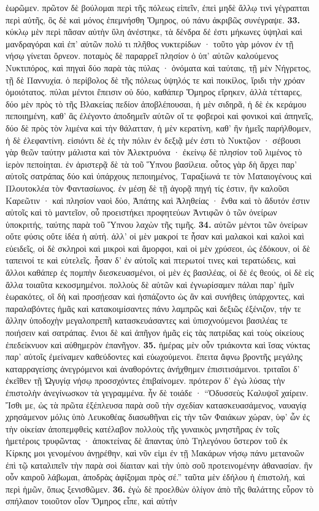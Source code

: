 \documentclass[a4paper, 11pt, oneside, polutonikogreek, german]{article}
\begin{document}
ἑωρῶμεν. πρῶτον δὲ βούλομαι περὶ τῆς πόλεως εἰπεῖν, ἐπεὶ μηδὲ ἄλλῳ τινὶ γέγραπται περὶ αὐτῆς, ὃς δὲ καὶ μόνος ἐπεμνήσθη Ὅμηρος, οὐ πάνυ ἀκριβῶς συνέγραψε. \textbf{33.} κύκλῳ μὲν περὶ πᾶσαν αὐτὴν ὕλη ἀνέστηκε, τὰ δένδρα δέ ἐστι μήκωνες ὑψηλαὶ καὶ μανδραγόραι καὶ ἐπ' αὐτῶν πολύ τι πλῆθος νυκτερίδων · τοῦτο γὰρ μόνον ἐν τῇ νήσῳ γίνεται ὄρνεον. ποταμὸς δὲ παραρρεῖ πλησίον ὁ ὑπ' αὐτῶν καλούμενος Νυκτιπόρος, καὶ πηγαὶ δύο παρὰ τὰς πύλας · ὀνόματα καὶ ταύταις, τῇ μὲν Νήγρετος, τῇ δὲ Παννυχία. ὁ περίβολος δὲ τῆς πόλεως ὑψηλός τε καὶ ποικίλος, ἴριδι τὴν χρόαν ὁμοιότατος. πύλαι μέντοι ἔπεισιν οὐ δύο, καθάπερ Ὅμηρος εἴρηκεν, ἀλλὰ τέτταρες, δύο μὲν πρὸς τὸ τῆς Βλακείας πεδίον ἀποβλέπουσαι, ἡ μὲν σιδηρᾶ, ἡ δὲ ἐκ κεράμου πεποιημένη, καθ' ἃς ἐλέγοντο ἀποδημεῖν αὐτῶν οἵ τε φοβεροὶ καὶ φονικοὶ καὶ ἀπηνεῖς, δύο δὲ πρὸς τὸν λιμένα καὶ τὴν θάλατταν, ἡ μὲν κερατίνη, καθ' ἣν ἡμεῖς παρήλθομεν, ἡ δὲ ἐλεφαντίνη. εἰσιόντι δὲ ἐς τὴν πόλιν ἐν δεξιᾷ μέν ἐστι τὸ Νυκτῷον · σέβουσι γὰρ θεῶν ταύτην μάλιστα καὶ τὸν Ἀλεκτρυόνα · ἐκείνῳ δὲ πλησίον τοῦ λιμένος τὸ ἱερὸν πεποίηται. ἐν ἀριστερᾷ δὲ τὰ τοῦ Ὕπνου βασίλεια. οὗτος γὰρ δὴ ἄρχει παρ' αὐτοῖς σατράπας δύο καὶ ὑπάρχους πεποιημένος, Ταραξίωνά τε τὸν Ματαιογένους καὶ Πλουτοκλέα τὸν Φαντασίωνος. ἐν μέσῃ δὲ τῇ ἀγορᾷ πηγή τίς ἐστιν, ἣν καλοῦσι Καρεῶτιν · καὶ πλησίον ναοὶ δύο, Ἀπάτης καὶ Ἀληθείας · ἔνθα καὶ τὸ ἄδυτόν ἐστιν αὐτοῖς καὶ τὸ μαντεῖον, οὗ προειστήκει προφητεύων Ἀντιφῶν ὁ τῶν ὀνείρων ὑποκριτής, ταύτης παρὰ τοῦ Ὕπνου λαχὼν τῆς τιμῆς. \textbf{34.} αὐτῶν μέντοι τῶν ὀνείρων οὔτε φύσις οὔτε ἰδέα ἡ αὐτή. ἀλλ' οἱ μὲν μακροί τε ἦσαν καὶ μαλακοὶ καὶ καλοὶ καὶ εὐειδεῖς, οἱ δὲ σκληροὶ καὶ μικροὶ καὶ ἄμορφοι, καὶ οἱ μὲν χρύσεοι, ὡς ἐδόκουν, οἱ δὲ ταπεινοί τε καὶ εὐτελεῖς. ἦσαν δ' ἐν αὐτοῖς καὶ πτερωτοί τινες καὶ τερατώδεις, καὶ ἄλλοι καθάπερ ἐς πομπὴν διεσκευασμένοι, οἱ μὲν ἐς βασιλέας, οἱ δὲ ἐς θεούς, οἱ δὲ εἰς ἄλλα τοιαῦτα κεκοσμημένοι. πολλοὺς δὲ αὐτῶν καὶ ἐγνωρίσαμεν πάλαι παρ' ἡμῖν ἑωρακότες, οἳ δὴ καὶ προσῄεσαν καὶ ἠσπάζοντο ὡς ἂν καὶ συνήθεις ὑπάρχοντες, καὶ παραλαβόντες ἡμᾶς καὶ κατακοιμίσαντες πάνυ λαμπρῶς καὶ δεξιῶς ἐξένιζον, τήν τε ἄλλην ὑποδοχὴν μεγαλοπρεπῆ κατασκευάσαντες καὶ ὑπισχνούμενοι βασιλέας τε ποιήσειν καὶ σατράπας. ἔνιοι δὲ καὶ ἀπῆγον ἡμᾶς εἰς τὰς πατρίδας καὶ τοὺς οἰκείους ἐπεδείκνυον καὶ αὐθημερὸν ἐπανῆγον. \textbf{35.} ἡμέρας μὲν οὖν τριάκοντα καὶ ἴσας νύκτας παρ' αὐτοῖς ἐμείναμεν καθεύδοντες καὶ εὐωχούμενοι. ἔπειτα ἄφνω βροντῆς μεγάλης καταρραγείσης ἀνεγρόμενοι καὶ ἀναθορόντες ἀνήχθημεν ἐπισιτισάμενοι. τριταῖοι δ' ἐκεῖθεν τῇ Ὠγυγίᾳ νήσῳ προσσχόντες ἐπιβαίνομεν. πρότερον δ' ἐγὼ λύσας τὴν ἐπιστολὴν ἀνεγίνωσκον τὰ γεγραμμένα. ἦν δὲ τοιάδε · "`Ὀδυσσεὺς Καλυψοῖ χαίρειν. Ἴσθι με, ὡς τὰ πρῶτα ἐξέπλευσα παρὰ σοῦ τὴν σχεδίαν κατασκευασάμενος, ναυαγίᾳ χρησάμενον μόλις ὑπὸ Λευκοθέας διασωθῆναι εἰς τὴν τῶν Φαιάκων χώραν, ὑφ' ὧν ἐς τὴν οἰκείαν ἀποπεμφθεὶς κατέλαβον πολλοὺς τῆς γυναικὸς μνηστῆρας ἐν τοῖς ἡμετέροις τρυφῶντας · ἀποκτείνας δὲ ἅπαντας ὑπὸ Τηλεγόνου ὕστερον τοῦ ἐκ Κίρκης μοι γενομένου ἀνῃρέθην, καὶ νῦν εἰμι ἐν τῇ Μακάρων νήσῳ πάνυ μετανοῶν ἐπὶ τῷ καταλιπεῖν τὴν παρὰ σοὶ δίαιταν καὶ τὴν ὑπὸ σοῦ προτεινομένην ἀθανασίαν. ἢν οὖν καιροῦ λάβωμαι, ἀποδρὰς ἀφίξομαι πρὸς σέ."' ταῦτα μὲν ἐδήλου ἡ ἐπιστολή, καὶ περὶ ἡμῶν, ὅπως ξενισθῶμεν. \textbf{36.} ἐγὼ δὲ προελθὼν ὀλίγον ἀπὸ τῆς θαλάττης εὗρον τὸ σπήλαιον τοιοῦτον οἷον Ὅμηρος εἶπε, καὶ αὐτὴν 
\end{document}
